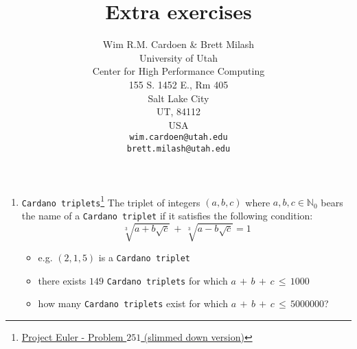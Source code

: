 \documentclass[10pt]{article}
\begin{document}
\title{Extra exercises}
\author{Wim R.M. Cardoen \& Brett Milash\\
        University of Utah\\
        Center for High Performance Computing\\
        155 S. 1452 E., Rm 405\\
        Salt Lake City\\
        UT, 84112\\
        USA\\
        \texttt{wim.cardoen@utah.edu}\\
	\texttt{brett.milash@utah.edu}}
\renewcommand{\today}{February 18, 2024}
\renewcommand{\labelitemii}{$\star$}
\maketitle

\begin{enumerate}
	\item \texttt{Cardano triplets}\footnote{\href{https://www.projecteuler.net/problem=251}{Project Euler - Problem $251$ (slimmed down version)}}\newline
  	 The triplet of integers $(a,b,c)$ where $a,b,c \in \mathbb{N}_0$ bears the name 
         of a \texttt{Cardano triplet} if it satisfies the following condition:
  	 \begin{equation}
  	    \displaystyle \sqrt[3]{a+b\sqrt{c}}\,+\, \sqrt[3]{a-b\sqrt{c}}   =   1 \nonumber
	 \end{equation}		
         \begin{itemize}
            \item e.g. $(2,1,5)$ is a \texttt{Cardano triplet}
            \item there exists $149$ \texttt{Cardano triplets} for which $a\,+\,b\,+\,c\,\le\,1000$
            \item how many \texttt{Cardano triplets} exist for which $a\,+\,b\,+\,c\,\le\,5000000$?
         \end{itemize}			 
\end{enumerate}
\renewcommand \thesection{\Roman{section}}

%
%
\end{document}
